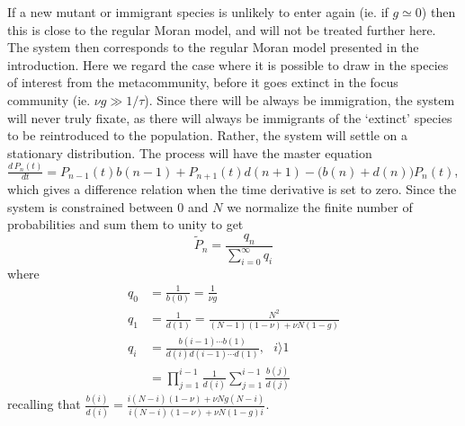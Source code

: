 If a new mutant or immigrant species is unlikely to enter again (ie. if $g\simeq 0$) then this is close to the regular Moran model, and will not be treated further here. %
The system then corresponds to the regular Moran model presented in the introduction. 
Here we regard the case where it is possible to draw in the species of interest from the metacommunity, before it goes extinct in the focus community (ie. $\nu g \gg 1/\tau$). %
Since there will be always be immigration, the system will never truly fixate, as there will always be immigrants of the `extinct' species to be reintroduced to the population.  
Rather, the system will settle on a stationary distribution. 
The process will have the master equation $\frac{d\,P_n(t)}{dt} = P_{n-1}(t)b(n-1) + P_{n+1}(t)d(n+1) - \big(b(n)+d(n)\big)P_n(t)$,
which gives a difference relation when the time derivative is set to zero. 
Since the system is constrained between $0$ and $N$ we normalize the finite number of probabilities and sum them to unity to get
\begin{equation}
\widetilde{P}_n = \frac{q_n}{\sum_{i=0}^\infty q_i}
\end{equation}
where
\begin{align*}
 q_0 &= \frac{1}{b(0)} = \frac{1}{\nu g} \\
 q_1 &= \frac{1}{d(1)} = \frac{N^2}{(N-1)(1-\nu) + \nu N(1-g)} \\
 q_i &= \frac{b(i-1)\cdots b(1)}{d(i)d(i-1)\cdots d(1)}, \text{  } i\rangle1 \\
     &= \prod_{j=1}^{i-1} \frac{1}{d(i)}\sum_{j=1}^{i-1}\frac{b(j)}{d(j)}
\end{align*}
recalling that $\frac{b(i)}{d(i)} = \frac{i(N-i)(1-\nu) + \nu Ng(N-i)}{i(N-i)(1-\nu) + \nu N(1-g)i}$.
%
